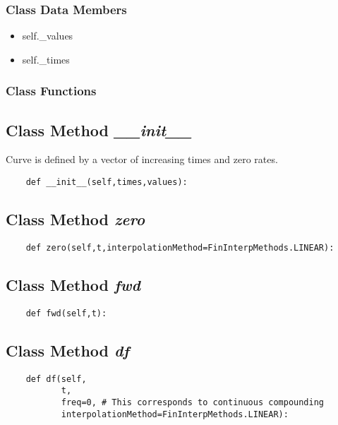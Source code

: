 \documentclass[twoside,11pt]{book}
\begin{document}
\subsubsection{Class Data Members}
\begin{itemize}
\item{self.\_values}
\item{self.\_times}
\end{itemize}

\subsubsection{Class Functions}

\subsection{Class Method {\it \_\_init\_\_}}
Curve is defined by a vector of increasing times and zero rates. 

\begin{lstlisting}
    def __init__(self,times,values):
\end{lstlisting}

\subsection{Class Method {\it zero}}


\begin{lstlisting}
    def zero(self,t,interpolationMethod=FinInterpMethods.LINEAR):
\end{lstlisting}

\subsection{Class Method {\it fwd}}


\begin{lstlisting}
    def fwd(self,t):
\end{lstlisting}

\subsection{Class Method {\it df}}


\begin{lstlisting}
    def df(self,
           t, 
           freq=0, # This corresponds to continuous compounding
           interpolationMethod=FinInterpMethods.LINEAR):
\end{lstlisting}
\end{document}
